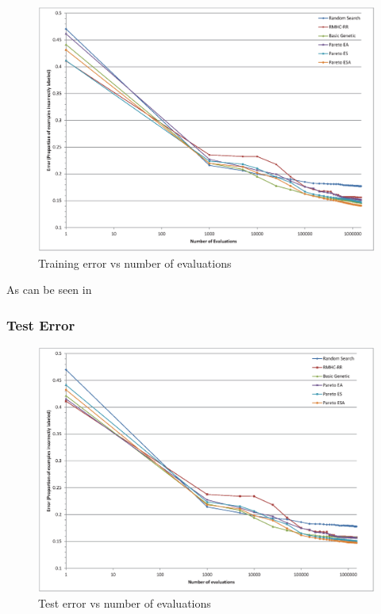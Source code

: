 \documentclass{acm_proc_article-sp}
\begin{document}
\begin{figure}[h]
\centering
\includegraphics[width=\linewidth]{train_chart.eps}
\caption{Training error vs number of evaluations}
\end{figure}

As can be seen in \

\subsubsection{Test Error}

\begin{figure}[h]
\centering
\includegraphics[width=\linewidth]{test_chart.eps}
\caption{Test error vs number of evaluations}
\end{figure}
\end{document}
